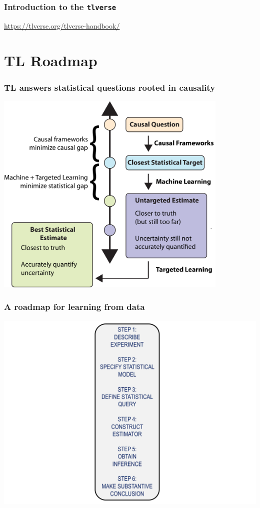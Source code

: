 \documentclass[t]{beamer}
\begin{document}
\begin{frame}
  \frametitle{Introduction to the \texttt{tlverse}}
  \url{https://tlverse.org/tlverse-handbook/}
\end{frame}

\section{TL Roadmap}

\begin{frame}
  \frametitle{TL answers statistical questions rooted in causality}
  \vspace{-1em}
  \begin{center}
  \includegraphics[width=0.84\textwidth]{figures/schematic-fixed.pdf}
  \end{center}
\end{frame}

\begin{frame}
  \frametitle{A roadmap for learning from data}
  \vspace{-20pt}
  \begin{center}
  \includegraphics[width = 1.05\textwidth]{figures/roadmap.pdf}
  \end{center}
\end{frame}
\end{document}
